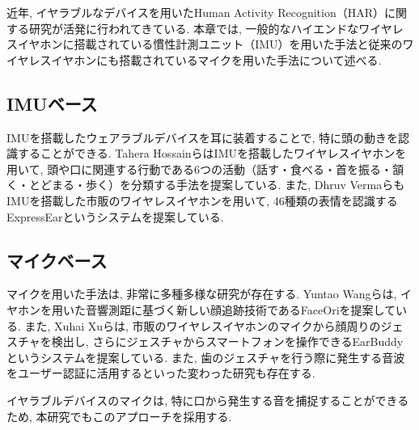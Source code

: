 近年, イヤラブルなデバイスを用いたHuman Activity Recognition（HAR）に関する研究が活発に行われてきている. 本章では, 一般的なハイエンドなワイヤレスイヤホンに搭載されている慣性計測ユニット（IMU）を用いた手法と従来のワイヤレスイヤホンにも搭載されているマイクを用いた手法について述べる.

\subsection{IMUベース}

IMUを搭載したウェアラブルデバイスを耳に装着することで, 特に頭の動きを認識することができる. Tahera HossainらはIMUを搭載したワイヤレスイヤホンを用いて, 頭や口に関連する行動である6つの活動（話す・食べる・首を振る・頷く・とどまる・歩く）を分類する手法を提案している\cite{10.1145/3341162.3343822}. また, Dhruv VermaらもIMUを搭載した市販のワイヤレスイヤホンを用いて, 46種類の表情を認識するExpressEarというシステムを提案している\cite{10.1145/3478085}.

\subsection{マイクベース}

マイクを用いた手法は, 非常に多種多様な研究が存在する. Yuntao Wangらは, イヤホンを用いた音響測距に基づく新しい顔追跡技術であるFaceOriを提案している\cite{10.1145/3491102.3517698}. また, Xuhai Xuらは, 市販のワイヤレスイヤホンのマイクから顔周りのジェスチャを検出し, さらにジェスチャからスマートフォンを操作できるEarBuddyというシステムを提案している\cite{10.1145/3313831.3376836}. また, 歯のジェスチャを行う際に発生する音波をユーザー認証に活用するといった変わった研究も存在する\cite{10.1145/3460120.3485340}.

イヤラブルデバイスのマイクは, 特に口から発生する音を捕捉することができるため, 本研究でもこのアプローチを採用する.


